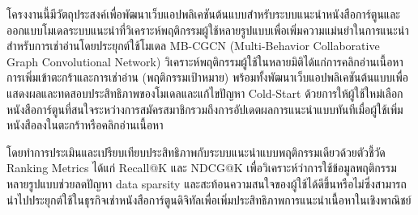 %

โครงงานนี้มีวัตถุประสงค์เพื่อพัฒนาเว็บแอปพลิเคชันต้นแบบสำหรับระบบแนะนำหนังสือการ์ตูนและออกแบบโมเดลระบบแนะนำที่วิเคราะห์พฤติกรรมผู้ใช้หลายรูปแบบเพื่อเพิ่มความแม่นยำในการแนะนำสำหรับการเช่าอ่านโดยประยุกต์ใช้โมเดล MB-CGCN (Multi-Behavior Collaborative Graph Convolutional Network) วิเคราะห์พฤติกรรมผู้ใช้ในหลายมิติได้แก่การคลิกอ่านเนื้อหาการเพิ่มเข้าตะกร้าและการเช่าอ่าน (พฤติกรรมเป้าหมาย) พร้อมทั้งพัฒนาเว็บแอปพลิเคชันต้นแบบเพื่อแสดงผลและทดสอบประสิทธิภาพของโมเดลและแก้ไขปัญหา Cold-Start ด้วยการให้ผู้ใช้ใหม่เลือกหนังสือการ์ตูนที่สนใจระหว่างการสมัครสมาชิกรวมถึงการอัปเดตผลการแนะนำแบบทันทีเมื่อผู้ใช้เพิ่มหนังสือลงในตะกร้าหรือคลิกอ่านเนื้อหา

โดยทำการประเมินและเปรียบเทียบประสิทธิภาพกับระบบแนะนำแบบพฤติกรรมเดียวด้วยตัวชี้วัด Ranking Metrics ได้แก่ Recall@K และ NDCG@K เพื่อวิเคราะห์ว่าการใช้ข้อมูลพฤติกรรมหลายรูปแบบช่วยลดปัญหา data sparsity และสะท้อนความสนใจของผู้ใช้ได้ดีขึ้นหรือไม่ซึ่งสามารถนำไปประยุกต์ใช้ในธุรกิจเช่าหนังสือการ์ตูนดิจิทัลเพื่อเพิ่มประสิทธิภาพการแนะนำเนื้อหาในเชิงพาณิชย์

